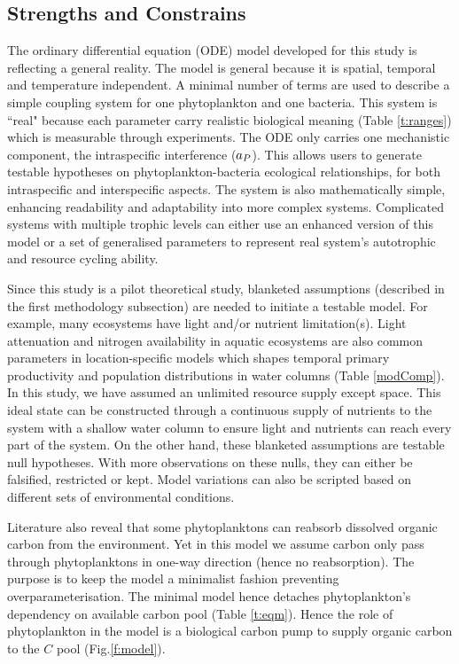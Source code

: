 \documentclass[../thesis.tex]{subfiles} %
\begin{document}
\subsection{Strengths and Constrains}
The ordinary differential equation (ODE) model developed for this study is reflecting a general reality.  The model is general because it is spatial, temporal and temperature independent.  A minimal number of terms are used to describe a simple coupling system for one phytoplankton and one bacteria.  This system is ``real" because each parameter carry realistic biological meaning (Table \ref{t:ranges}) which is measurable through experiments.  The ODE only carries one mechanistic component, the intraspecific interference ($a_P$).  This allows users to generate testable hypotheses on phytoplankton-bacteria ecological relationships, for both intraspecific and interspecific aspects.  The system is also mathematically simple, enhancing readability and adaptability into more complex systems.  Complicated systems with multiple trophic levels can either use an enhanced version of this model or a set of generalised parameters to represent real system's autotrophic and resource cycling ability.

Since this study is a pilot theoretical study, blanketed assumptions (described in the first methodology subsection) are needed to initiate a testable model.  For example, many ecosystems have light and/or nutrient limitation(s).  Light attenuation and nitrogen availability in aquatic ecosystems are also common parameters in location-specific models which shapes temporal primary productivity and population distributions in water columns (Table \ref{modComp}).  In this study, we have assumed an unlimited resource supply except space.  This ideal state can be constructed through a continuous supply of nutrients to the system with a shallow water column to ensure light and nutrients can reach every part of the system.  On the other hand, these blanketed assumptions are testable null hypotheses.  With more observations on these nulls, they can either be falsified, restricted or kept.  Model variations can also be scripted based on different sets of environmental conditions.

Literature also reveal that some phytoplanktons can reabsorb dissolved organic carbon from the environment.\autocite{j1989respiration,samejima1958heterotrophic}  Yet in this model we assume carbon only pass through phytoplanktons in one-way direction (hence no reabsorption).  The purpose is to keep the model a minimalist fashion preventing overparameterisation.  The minimal model hence detaches phytoplankton's dependency on available carbon pool (Table \ref{t:eqm}).  Hence the role of phytoplankton in the model is a biological carbon pump to supply organic carbon to the $C$ pool (Fig.\ref{f:model}).
\end{document}
